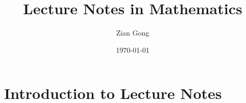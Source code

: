\documentclass[11pt]{amsbook}
\title{Lecture Notes in Mathematics}
\author{Zian Gong}
\date{\today}
\theoremstyle{definition}
\theoremstyle{remark}
\begin{document}
\frontmatter
\maketitle
\tableofcontents

\mainmatter
\chapter{Introduction to Lecture Notes}


\backmatter
\end{document}
